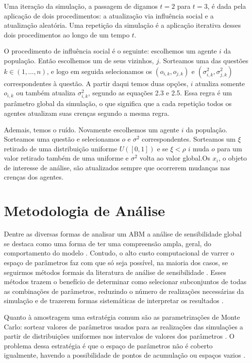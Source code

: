  Uma iteração da simulação, a
passagem de digamos \(t=2\) para \(t=3\), é dada pela aplicação de dois
procedimentos: a atualização via influência social e a atualização aleatória.
Uma repetição da simulação é a aplicação iterativa desses dois procedimentos ao
longo de um tempo \(t \).

O procedimento de influência social é o seguinte: escolhemos um agente \(i\)
da população. Então escolhemos um de seus vizinhos, \(j\). Sorteamos uma das
questões \(k \in (1,\ldots,n)\), e logo em seguida selecionamos os \((o_{i,k},o_{j,k})\) e
\((\sigma_{i,k}^2,\sigma_{j,k}^2)\) correspondentes à questão. A partir daqui temos duas
opções, \(i\) atualiza somente \(o_{i,k}\) ou também atualiza \(\sigma_{i,k}^2\),
segundo as equações 2.3 e 2.5. Essa regra é um parâmetro global da simulação,
o que significa que a cada repetição todos os agentes atualizam suas crenças
segundo a mesma regra.

Ademais, temos o ruído. Novamente escolhemos um agente \(i\) da população.
Sorteamos uma questão e selecionamos \(o\) e \(\sigma^2\) correspondentes. Sorteamos
um \(\xi\) retirado de uma distribuição uniforme \(U([0,1])\) e se \(\xi < \rho\) \(i\)
muda \(o\) para um valor retirado também de uma uniforme e \(\sigma^2\) volta ao
valor global.Os \(x_i\), o objeto de interesse de análise, são atualizados
sempre que ocorrerem mudanças nas crenças dos agentes.



\section{Metodologia de Análise}

Dentre as diversas formas de analisar um ABM a análise de sensibilidade global
se destaca como uma forma de ter uma compreensão ampla, geral, do comportamento
do modelo \cite{north2007managing}. Contudo, o  alto custo computacional de varrer
o espaço de parâmetros faz com que só seja possível, na maioria dos casos, se
seguirmos métodos formais da literatura de análise de sensibilidade
\cite{railsback2012agent}. Esses métodos trazem o benefício de determinar como
selecionar subconjuntos de todas as combinações de parâmetros, reduzindo o
número de realizações necessárias da simulação e de trazerem formas sistemáticas
de interpretar os resultados \cite{railsback2012agent}.

Quanto à amostragem uma estratégia comum são as parametrizações de Monte Carlo:
sortear valores de parâmetros usados para as realizações das simulações a partir
de distribuições uniformes nos intervalos de valores dos parâmetros
\cite{laver2011party}. O problema dessa estratégia é que o espaço de parâmetros
não é coberto igualmente, havendo a possibilidade de pontos de acumulação ou
espaços vazios \cite{pereda2017brief}.


